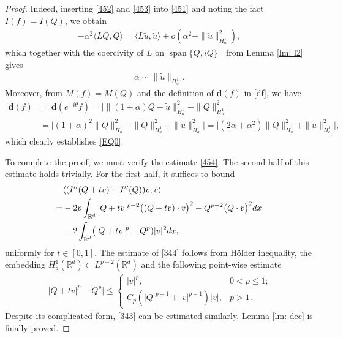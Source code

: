 \documentclass[12pt]{amsart}
\newcommand{\R}{\mathbb R}
\newcommand{\bd}{\textbf{d}}
\newcommand{\nha}{H^1_a}
\DeclareMathOperator{\spa}{span}
\begin{document}
\begin{proof}
 Indeed, inserting \eqref{452} and \eqref{453} into \eqref{451} and noting the fact $I(f)=I(Q)$, we obtain  
 \begin{align*}
 -\alpha^2 \langle LQ, Q\rangle =\langle L\tilde u, \tilde u\rangle+o(\alpha^2+\|\tilde u\|_{\nha}^2),
 \end{align*}
which together with the coercivity of $L$ on $\spa\{Q, iQ\}^{\perp}$ from Lemma \ref{lm: l2} gives 
\begin{align*}
\alpha\sim \|\tilde u\|_{\nha}.
\end{align*}
Moreover, from $M(f)=M(Q)$ and the definition of $\bd (f)$ in \eqref{df}, we have
\begin{align*}
\mathbf{d}(f)&=\mathbf{d}(e^{-i\theta} f)=\biggl |\bigl\|(1+\alpha)Q+\tilde u\bigr\|_{\nha}^2-\|Q\|_{\nha}^2\biggr|\\
&=\bigl |(1+\alpha)^2 \|Q\|_{\nha}^2 -\|Q\|_{\nha}^2+\|\tilde u\|_{\nha}^2\bigr|=\bigl|(2\alpha+\alpha^2)\|Q\|_{\nha}^2+
\|\tilde u\|_{\nha}^2\bigr|,
\end{align*}
which clearly establishes \eqref{EQ0}. 

To complete the proof, we must verify the estimate \eqref{454}. The second half of this estimate holds trivially. For the first half, it suffices to bound 
\begin{align}
& \langle (I''(Q+tv)-I''(Q))v, v\rangle\notag\\
=&-2p \int_{\R^d} |Q+tv|^{p-2}\bigl((Q+tv)\cdot v\bigr)^2-Q^{p-2}\bigl(Q\cdot v\bigr)^2 dx\label{343}\\
& -2\int_{\R^d}\bigl(|Q+tv|^p-Q^p)|v|^2 dx, \label{344}
\end{align}
uniformly for $t\in [0,1]$. The estimate of \eqref{344} follows from H\"older inequality, the embedding $\nha(\R^d)\subset L^{p+2}(\R^d)$ and the following point-wise estimate 
\begin{align}\label{345}
\bigl | |Q+tv|^p-Q^p\bigr|\le 
\begin{cases}
|v|^p,& 0<p\le 1;\\
C_p(|Q|^{p-1}+|v|^{p-1})|v|, & p>1. 
\end{cases}
\end{align}
Despite its complicated form, \eqref{343} can be estimated similarly. Lemma \ref{lm: dec} is finally proved. 
\end{proof}
\end{document}
